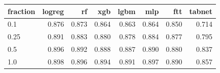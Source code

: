 \begin{tabular}{lrrrrrrr}
\toprule
fraction & logreg & rf & xgb & lgbm & mlp & ftt & tabnet \\
\midrule
0.1 & 0.876 & 0.873 & 0.864 & 0.863 & 0.864 & 0.850 & 0.714 \\
0.25 & 0.891 & 0.883 & 0.880 & 0.878 & 0.884 & 0.877 & 0.795 \\
0.5 & 0.896 & 0.892 & 0.888 & 0.887 & 0.890 & 0.880 & 0.837 \\
1.0 & 0.898 & 0.896 & 0.894 & 0.891 & 0.897 & 0.890 & 0.857 \\
\bottomrule
\end{tabular}
